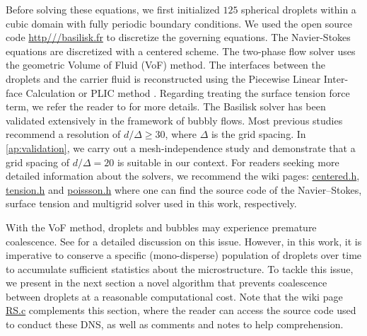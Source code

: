 Before solving these equations, we first initialized $125$ spherical droplets within a cubic domain with fully periodic boundary conditions. 
We used the open source code \url{http///basilisk.fr} to discretize the governing equations. 
The Navier-Stokes equations are discretized with a centered scheme.
The two-phase flow solver uses the geometric Volume of Fluid (VoF) method. 
The interfaces between the droplets and the carrier fluid is reconstructed using the Piecewise Linear Inter-face Calculation or PLIC method \citet[Chapter 5.]{tryggvason2011direct}.
Regarding treating the surface tension force term, we refer the reader to \citet{popinet2018numerical} for more details. 
The Basilisk solver has been validated extensively in the framework of bubbly flows. 
Most previous studies \citep{hidman2023assessing,innocenti2020direct} recommend a resolution of $d/\Delta \ge  30$, where $\Delta$ is the grid spacing. 
In \ref{ap:validation}, we carry out a mesh-independence study and demonstrate that a grid spacing of $d/\Delta = 20$ is suitable in our context.
For readers seeking more detailed information about the solvers, we recommend the wiki pages: \href{http://basilisk.fr/src/navier-stokes/centered.h}{centered.h}, \href{http://basilisk.fr/src/tension.h}{tension.h} and \href{http://basilisk.fr/src/poissson.h}{poissson.h} where one can find the source code of the Navier--Stokes, surface tension and multigrid solver used in this work, respectively. 

With the VoF method, droplets and bubbles may experience premature coalescence.
See \citet[Appendix B]{innocenti2020direct} for a detailed discussion on this issue.
However, in this work, it is imperative to conserve a specific (mono-disperse) population of droplets over time to accumulate sufficient statistics about the microstructure.
To tackle this issue, we present in the next section a novel algorithm that prevents coalescence between droplets at a reasonable computational cost. 
Note that the wiki page \href{http://basilisk.fr/sandbox/fintzin/Rising-suspension/RS.c}{RS.c} complements this section, where the reader can access the source code used to conduct these DNS, as well as comments and notes to help comprehension. 




